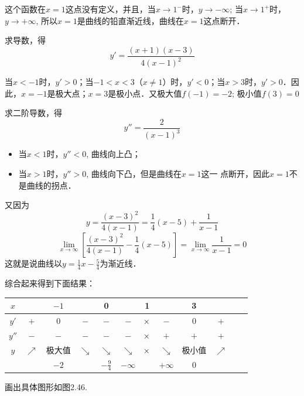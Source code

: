 \begin{solution}
    这个函数在$x=1$这点没有定义，并且，当$x\to 1^-$时，$y\to -\infty$; 当$x\to 1^+$时，$y\to +\infty$, 所以$x=1$是曲线的铅直渐近线，曲线在$x=1$这点断开．
    
求导数，得
\[y'= \frac{(x+1) (x-3)}{4 (x-1)^2}\]

当$x<-1$时，$y'>0$；当$-1<x<3$（$x\ne1$）时，$y'<0$；当$x>3$时，$y'>0$．因此，$x=-1$是极大点；$x=3$是极小点．又极大值$f(-1)=-2$; 极小值$f(3)=0$

求二阶导数，得
\[y''=\frac{2}{(x-1)^3}\]
\begin{itemize}
    \item 当$x<1$时，$y''<0$, 曲线向上凸；
    \item 当$x>1$时，$y''>0$, 曲线向下凸，但是曲线在$x=1$这一
    点断开，因此$x=1$不是曲线的拐点．
\end{itemize}

又因为
\[y=\frac{(x-3)^2}{4(x-1)}=\frac{1}{4}(x-5)+\frac{1}{x-1}\]
\[\lim_{x\to \infty}\left[\frac{(x-3)^2}{4(x-1)}-\frac{1}{4}(x-5)\right]=\lim_{x\to\infty}\frac{1}{x-1}=0\]
这就是说曲线以$y=\frac{1}{4}x-\frac{5}{4}$为渐近线．

综合起来得到下面结果：
\begin{center}
    \begin{tabular}{cccccccccccc}
    \hline
    $x$ & &$-1$&&0&&1&&3&\\
    \hline
    $y'$& $+$ & 0&$-$&$-$&$-$&$\times$&$-$&0&$+$\\
    $y''$&$-$&$-$&$-$&$-$&$-$&$\times$&$+$&$+$&$+$\\
    $y$&$\nearrow$ &极大值& $\searrow$  & $\searrow$&$\searrow$ & $\times$& $\searrow$ & 极小值 & $\nearrow$  \\
    &  &$-2$&&$-\frac{9}{4}$&$-\infty $&&$+\infty$&0 &\\
    \hline
    \end{tabular}
    \end{center}

画出具体图形如图2.46.
\begin{figure}[htp]
    \centering
{} 
    \caption{}
\end{figure}
\end{solution}



